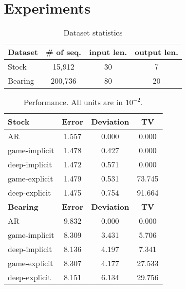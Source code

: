 \section{Experiments}
\label{sec:experiment}

\begin{table}[t]
\centering
\begin{tabular}{ l  c  c  c }  
\hline
\bf Dataset & \bf\small \# of seq. & \small \bf input len. & \small \bf output len. \\
\hline\hline
Stock & 15,912 & 30 & 7\\
Bearing & 200,736 & 80 & 20\\
\hline
\end{tabular}
\vspace{-2mm}
\caption{Dataset statistics}
\vspace{-2mm}
\label{tab:stat}
\end{table}	
\begin{table}[t]
\centering
\begin{tabular}{ l  c  c  c }  
\hline
\bf Stock & \bf\small Error & \small \bf Deviation & \small \bf TV\\
\hline\hline
AR & 1.557 & 0.000 & 0.000\\
\hline
game-implicit & 1.478 & 0.427 & 0.000\\
deep-implicit & 1.472 & 0.571 & 0.000\\
\hline
game-explicit & 1.479 & 0.531 & 73.745\\
deep-explicit & 1.475 & 0.754 & 91.664\\
\hline
\hline
\bf Bearing & \bf\small Error & \small \bf Deviation & \small \bf TV\\
\hline\hline
AR & 9.832 & 0.000 & 0.000\\
\hline
game-implicit & 8.309 & 3.431 & 5.706\\
deep-implicit & 8.136 & 4.197 & 7.341\\
\hline
game-explicit & 8.307 & 4.177 & 27.533\\
deep-explicit & 8.151 & 6.134 & 29.756\\
\hline
\end{tabular}
\vspace{-2mm}
\caption{Performance. All units are in $10^{-2}$.}
\vspace{-6mm}
\label{tab:peref}
\end{table}	

